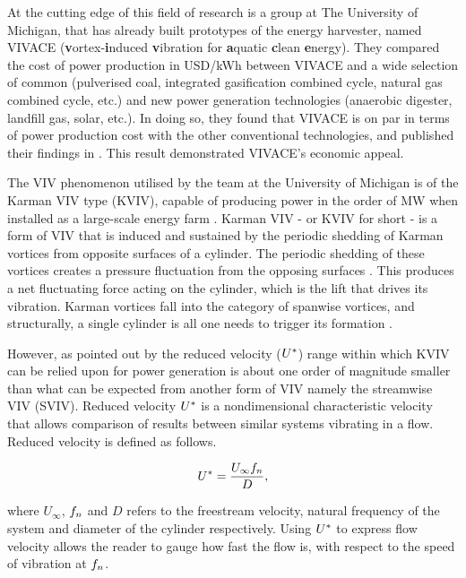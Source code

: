 \documentclass[oneside]{utmthesis}
\begin{document}
At the cutting edge of this field of research is a group at The University of Michigan, that has already built prototypes of the energy harvester, named VIVACE (\textbf{v}ortex-\textbf{i}nduced \textbf{v}ibration for \textbf{a}quatic \textbf{c}lean \textbf{e}nergy). They compared the cost of power production in USD/kWh between VIVACE and a wide selection of common (pulverised coal, integrated gasification combined cycle, natural gas combined cycle, etc.) and new power generation technologies (anaerobic digester, landfill gas, solar, etc.). In doing so, they found that VIVACE is on par in terms of power production cost with the other conventional technologies, and published their findings in \citet{Bernitsas2008a}. This result demonstrated VIVACE's economic appeal.

The VIV phenomenon utilised by the team at the University of Michigan is of the Karman VIV type (KVIV), capable of producing power in the order of MW when installed as a large-scale energy farm \citep{Raghavan2007a}. Karman VIV - or KVIV for short - is a form of VIV that is induced and sustained by the periodic shedding of Karman vortices from opposite surfaces of a cylinder. The periodic shedding of these vortices creates a pressure fluctuation from the opposing surfaces \citep{Mei2021}. This produces a net fluctuating force acting on the cylinder, which is the lift that drives its vibration. Karman vortices fall into the category of spanwise vortices, and structurally, a single cylinder is all one needs to trigger its formation \citep{Liu2022}.

However, as pointed out by \citet{Koide2013} the reduced velocity ($U^{*}$) range within which KVIV can be relied upon for power generation is about one order of magnitude smaller than what can be expected from another form of VIV namely the streamwise VIV (SVIV). Reduced velocity $U^{*}$ is a nondimensional characteristic velocity that allows comparison of results between similar systems vibrating in a flow. Reduced velocity is defined as follows.

\begin{equation}
  U^{*} = \frac{U_{\infty} f_{n}}{D},
  \label{eq:reducedVelocity}
\end{equation}

\noindent where $U_{\infty}$, $f_{n}$ and $D$ refers to the freestream velocity, natural frequency of the system and diameter of the cylinder respectively. Using $U^{*}$ to express flow velocity allows the reader to gauge how fast the flow is, with respect to the speed of vibration at $f_{n}$.
\end{document}
